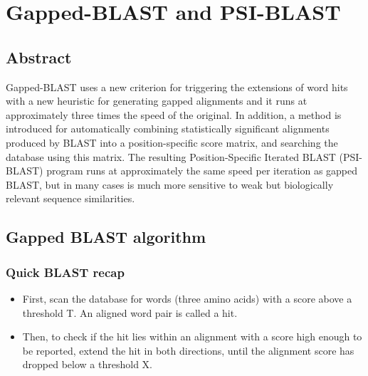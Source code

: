 \graphicspath{{chapters/07/images}}
\chapter{Gapped-BLAST and PSI-BLAST}

    \section{Abstract}
    Gapped-BLAST uses a new criterion for triggering the extensions of word hits with a new heuristic for generating gapped alignments and it runs at approximately three times the speed of the original. In addition, a method is introduced for automatically combining statistically significant alignments produced by BLAST into a position-specific score matrix, and searching the database using this matrix. The resulting Position-Specific Iterated BLAST (PSI-BLAST) program runs at approximately the same speed per iteration as gapped BLAST, but in many cases is much more sensitive to weak but biologically relevant sequence similarities.

    \section{Gapped BLAST algorithm}

        \subsection{Quick BLAST recap}
            \begin{itemize}
                \item First, scan the database for words (three amino acids) with a score above a  threshold T. An aligned word pair is called a hit.
                \item Then, to check if the hit lies within an alignment with a score high enough to be reported, extend the hit in both directions, until the alignment score has dropped below a threshold X.
            \end{itemize}


